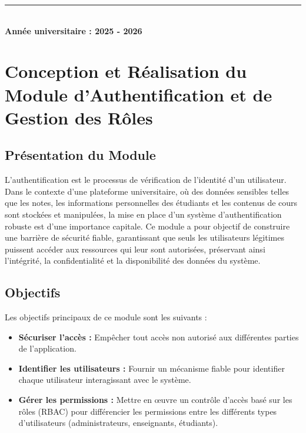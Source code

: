 \documentclass{report}
\begin{document}
\begin{titlepage}
\vfill

{\color{GoldenGlow}\rule{0.6\textwidth}{0.5pt}}\\[0.3cm]
{\large \textbf{\color{SoftEspresso}Année universitaire : 2025 - 2026}}

\end{titlepage}

\chapter{\color{SoftEspresso}Conception et Réalisation du Module d'Authentification et de Gestion des Rôles}

\section{\color{SoftEspresso}Présentation du Module}
L'authentification est le processus de vérification de l'identité d'un utilisateur. Dans le contexte d'une plateforme universitaire, où des données sensibles telles que les notes, les informations personnelles des étudiants et les contenus de cours sont stockées et manipulées, la mise en place d'un système d'authentification robuste est d'une importance capitale. Ce module a pour objectif de construire une barrière de sécurité fiable, garantissant que seuls les utilisateurs légitimes puissent accéder aux ressources qui leur sont autorisées, préservant ainsi l'intégrité, la confidentialité et la disponibilité des données du système.

\section{\color{SoftEspresso}Objectifs}
Les objectifs principaux de ce module sont les suivants :
\begin{itemize}
    \item \textbf{\color{SoftEspresso}Sécuriser l'accès :} Empêcher tout accès non autorisé aux différentes parties de l'application.
    \item \textbf{\color{SoftEspresso}Identifier les utilisateurs :} Fournir un mécanisme fiable pour identifier chaque utilisateur interagissant avec le système.
    \item \textbf{\color{SoftEspresso}Gérer les permissions :} Mettre en œuvre un contrôle d'accès basé sur les rôles (RBAC) pour différencier les permissions entre les différents types d'utilisateurs (administrateurs, enseignants, étudiants).
\end{itemize}
\end{document}

